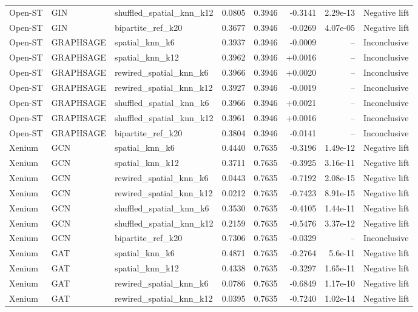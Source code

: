 \begin{longtable}{lllrrrrl}
Open-ST & GIN & shuffled\_spatial\_knn\_k12 & 0.0805 & 0.3946 & -0.3141 & 2.29e-13 & Negative lift \\
Open-ST & GIN & bipartite\_ref\_k20 & 0.3677 & 0.3946 & -0.0269 & 4.07e-05 & Negative lift \\
Open-ST & GRAPHSAGE & spatial\_knn\_k6 & 0.3937 & 0.3946 & -0.0009 & -- & Inconclusive \\
Open-ST & GRAPHSAGE & spatial\_knn\_k12 & 0.3962 & 0.3946 & +0.0016 & -- & Inconclusive \\
Open-ST & GRAPHSAGE & rewired\_spatial\_knn\_k6 & 0.3966 & 0.3946 & +0.0020 & -- & Inconclusive \\
Open-ST & GRAPHSAGE & rewired\_spatial\_knn\_k12 & 0.3927 & 0.3946 & -0.0019 & -- & Inconclusive \\
Open-ST & GRAPHSAGE & shuffled\_spatial\_knn\_k6 & 0.3966 & 0.3946 & +0.0021 & -- & Inconclusive \\
Open-ST & GRAPHSAGE & shuffled\_spatial\_knn\_k12 & 0.3961 & 0.3946 & +0.0016 & -- & Inconclusive \\
Open-ST & GRAPHSAGE & bipartite\_ref\_k20 & 0.3804 & 0.3946 & -0.0141 & -- & Inconclusive \\
Xenium & GCN & spatial\_knn\_k6 & 0.4440 & 0.7635 & -0.3196 & 1.49e-12 & Negative lift \\
Xenium & GCN & spatial\_knn\_k12 & 0.3711 & 0.7635 & -0.3925 & 3.16e-11 & Negative lift \\
Xenium & GCN & rewired\_spatial\_knn\_k6 & 0.0443 & 0.7635 & -0.7192 & 2.08e-15 & Negative lift \\
Xenium & GCN & rewired\_spatial\_knn\_k12 & 0.0212 & 0.7635 & -0.7423 & 8.91e-15 & Negative lift \\
Xenium & GCN & shuffled\_spatial\_knn\_k6 & 0.3530 & 0.7635 & -0.4105 & 1.44e-11 & Negative lift \\
Xenium & GCN & shuffled\_spatial\_knn\_k12 & 0.2159 & 0.7635 & -0.5476 & 3.37e-12 & Negative lift \\
Xenium & GCN & bipartite\_ref\_k20 & 0.7306 & 0.7635 & -0.0329 & -- & Inconclusive \\
Xenium & GAT & spatial\_knn\_k6 & 0.4871 & 0.7635 & -0.2764 & 5.6e-11 & Negative lift \\
Xenium & GAT & spatial\_knn\_k12 & 0.4338 & 0.7635 & -0.3297 & 1.65e-11 & Negative lift \\
Xenium & GAT & rewired\_spatial\_knn\_k6 & 0.0786 & 0.7635 & -0.6849 & 1.17e-10 & Negative lift \\
Xenium & GAT & rewired\_spatial\_knn\_k12 & 0.0395 & 0.7635 & -0.7240 & 1.02e-14 & Negative lift \\

\end{longtable}
